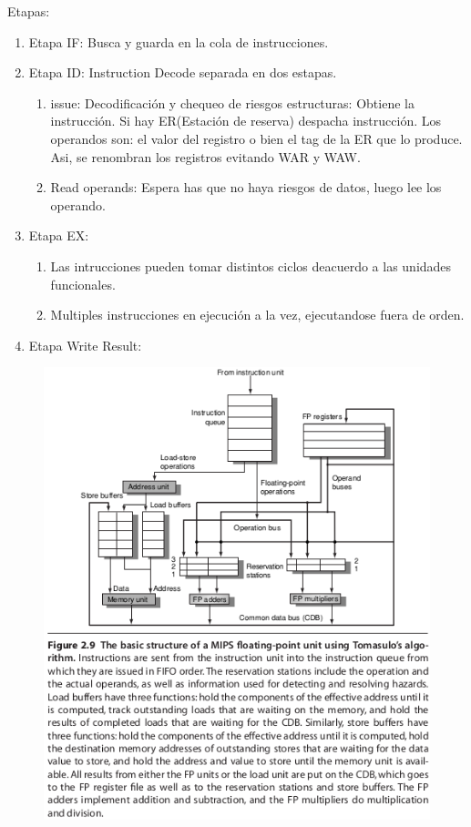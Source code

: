 \documentclass{article}
\begin{document}
Etapas:
\begin{enumerate}
    \item Etapa IF: Busca y guarda en la cola de instrucciones.
    \item Etapa ID: Instruction Decode separada en dos estapas.
    \begin{enumerate}
        \item issue: Decodificación y chequeo de riesgos estructuras: Obtiene la instrucción. Si hay ER(Estación de reserva) despacha instrucción. Los operandos son: el valor del registro o bien el tag de la ER que lo produce. Asi, se renombran los registros evitando WAR y WAW. 
        \item Read operands: Espera has que no haya riesgos de datos, luego lee los operando.
    \end{enumerate}
    \item Etapa EX: 
        \begin{enumerate}
            \item Las intrucciones pueden tomar distintos ciclos deacuerdo a las unidades funcionales.
            \item Multiples instrucciones en ejecución a la vez, ejecutandose fuera de orden.
        \end{enumerate}
    \item Etapa Write Result: 
\end{enumerate}

\newpage

\begin{figure}[h!]
    \includegraphics[width=\linewidth]{imagenes/pipeline/esquema-tomasulo.png}
\end{figure}
\end{document}

